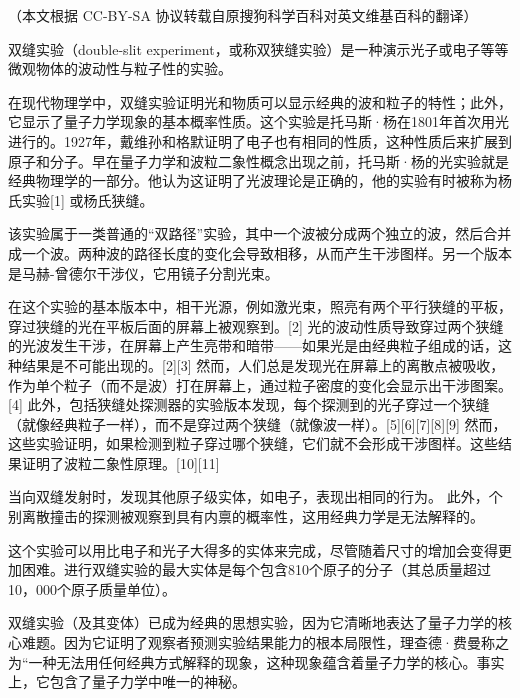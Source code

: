 
（本文根据 CC-BY-SA 协议转载自原搜狗科学百科对英文维基百科的翻译）

双缝实验（double-slit experiment，或称双狭缝实验）是一种演示光子或电子等等微观物体的波动性与粒子性的实验。

在现代物理学中，双缝实验证明光和物质可以显示经典的波和粒子的特性；此外，它显示了量子力学现象的基本概率性质。这个实验是托马斯·杨在1801年首次用光进行的。1927年，戴维孙和格默证明了电子也有相同的性质，这种性质后来扩展到原子和分子。早在量子力学和波粒二象性概念出现之前，托马斯·杨的光实验就是经典物理学的一部分。他认为这证明了光波理论是正确的，他的实验有时被称为杨氏实验[1] 或杨氏狭缝。

该实验属于一类普通的“双路径”实验，其中一个波被分成两个独立的波，然后合并成一个波。两种波的路径长度的变化会导致相移，从而产生干涉图样。另一个版本是马赫-曾德尔干涉仪，它用镜子分割光束。

在这个实验的基本版本中，相干光源，例如激光束，照亮有两个平行狭缝的平板，穿过狭缝的光在平板后面的屏幕上被观察到。[2] 光的波动性质导致穿过两个狭缝的光波发生干涉，在屏幕上产生亮带和暗带——如果光是由经典粒子组成的话，这种结果是不可能出现的。[2][3] 然而，人们总是发现光在屏幕上的离散点被吸收，作为单个粒子（而不是波）打在屏幕上，通过粒子密度的变化会显示出干涉图案。[4] 此外，包括狭缝处探测器的实验版本发现，每个探测到的光子穿过一个狭缝（就像经典粒子一样），而不是穿过两个狭缝（就像波一样）。[5][6][7][8][9] 然而，这些实验证明，如果检测到粒子穿过哪个狭缝，它们就不会形成干涉图样。这些结果证明了波粒二象性原理。[10][11]

当向双缝发射时，发现其他原子级实体，如电子，表现出相同的行为。 此外，个别离散撞击的探测被观察到具有内禀的概率性，这用经典力学是无法解释的。

这个实验可以用比电子和光子大得多的实体来完成，尽管随着尺寸的增加会变得更加困难。进行双缝实验的最大实体是每个包含810个原子的分子（其总质量超过10，000个原子质量单位）。

双缝实验（及其变体）已成为经典的思想实验，因为它清晰地表达了量子力学的核心难题。因为它证明了观察者预测实验结果能力的根本局限性，理查德·费曼称之为“一种无法用任何经典方式解释的现象，这种现象蕴含着量子力学的核心。事实上，它包含了量子力学中唯一的神秘。

